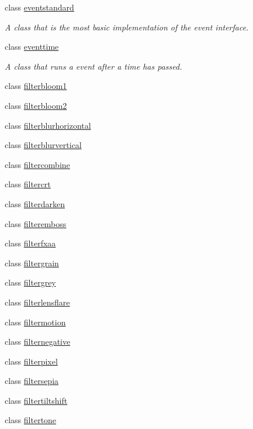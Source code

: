 \begin{DoxyCompactItemize}
class \hyperlink{classflounder_1_1eventstandard}{eventstandard}
\begin{DoxyCompactList}\small\item\em A class that is the most basic implementation of the event interface. \end{DoxyCompactList}\item 
class \hyperlink{classflounder_1_1eventtime}{eventtime}
\begin{DoxyCompactList}\small\item\em A class that runs a event after a time has passed. \end{DoxyCompactList}\item 
class \hyperlink{classflounder_1_1filterbloom1}{filterbloom1}
\item 
class \hyperlink{classflounder_1_1filterbloom2}{filterbloom2}
\item 
class \hyperlink{classflounder_1_1filterblurhorizontal}{filterblurhorizontal}
\item 
class \hyperlink{classflounder_1_1filterblurvertical}{filterblurvertical}
\item 
class \hyperlink{classflounder_1_1filtercombine}{filtercombine}
\item 
class \hyperlink{classflounder_1_1filtercrt}{filtercrt}
\item 
class \hyperlink{classflounder_1_1filterdarken}{filterdarken}
\item 
class \hyperlink{classflounder_1_1filteremboss}{filteremboss}
\item 
class \hyperlink{classflounder_1_1filterfxaa}{filterfxaa}
\item 
class \hyperlink{classflounder_1_1filtergrain}{filtergrain}
\item 
class \hyperlink{classflounder_1_1filtergrey}{filtergrey}
\item 
class \hyperlink{classflounder_1_1filterlensflare}{filterlensflare}
\item 
class \hyperlink{classflounder_1_1filtermotion}{filtermotion}
\item 
class \hyperlink{classflounder_1_1filternegative}{filternegative}
\item 
class \hyperlink{classflounder_1_1filterpixel}{filterpixel}
\item 
class \hyperlink{classflounder_1_1filtersepia}{filtersepia}
\item 
class \hyperlink{classflounder_1_1filtertiltshift}{filtertiltshift}
\item 
class \hyperlink{classflounder_1_1filtertone}{filtertone}

\end{DoxyCompactItemize}
